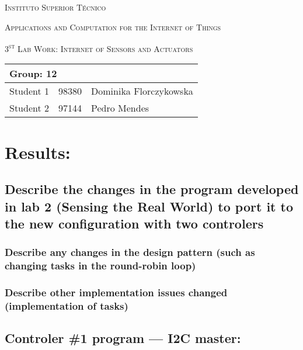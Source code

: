 \documentclass[10pt]{article}
\begin{document}
\begin{center}
    {\scshape Instituto Superior Técnico\par}
    \vspace{1cm}
    {\scshape\Large Applications and Computation for the Internet of Things\par}
    \vspace{1.5cm}
\end{center}
{\scshape\LARGE 3\textsuperscript{st} Lab Work: Internet of Sensors and Actuators}
\\
\begin{table}[h!]
    \centering
    \begin{tabular}{|l|l|p{10cm}|}
        \hline
        \multicolumn{3}{|l|}{Group: 12} \\[1.5ex] \hline
        Student 1 & 98380 & Dominika Florczykowska \\ [1.5ex]\hline
        Student 2 & 97144 & Pedro Mendes \\ [1.5ex]\hline
    \end{tabular}
\end{table}

\section{Results:}

\subsection{Describe the changes in the program developed in lab 2 (Sensing the
Real World) to port it to the new configuration with two controlers}

\subsubsection{Describe any changes in the design pattern (such as changing
tasks in the round-robin loop)}


\subsubsection{Describe other implementation issues changed (implementation of
tasks)}

\subsection{Controler \#1 program --- I2C master:}

\inputminted{cpp}{../arduino_sensor/sensor.hpp}
\end{document}
